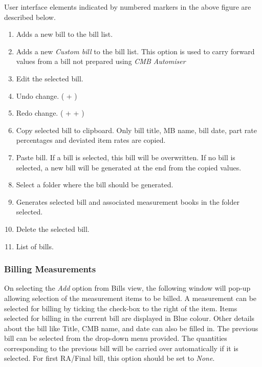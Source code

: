 \documentclass[twoside,a4paper]{refart}
\begin{document}
	 User interface elements indicated by numbered markers in the above figure are described below.
	 
	 \begin{enumerate}
	 	\item Adds a new bill to the bill list.
	 	\item Adds a new \emph{Custom bill} to the bill list. This option is used to carry forward values from a bill not prepared using \emph{CMB Automiser}
	 	\item Edit the selected bill.
	 	\item Undo change. ( + )
	 	\item Redo change. ( +  + )	 
	 	\item Copy selected bill to clipboard. Only bill title, MB name, bill date, part rate percentages and deviated item rates are copied.
	 	\item Paste bill. If a bill is selected, this bill will be overwritten. If no bill is selected, a new bill will be generated at the end from the copied values.
	 	\item Select a folder where the bill should be generated.
	 	\item Generates selected bill and associated measurement books in the folder selected.
	 	\item Delete the selected bill.
	 	\item List of bills.
	 \end{enumerate}
	 
	 \subsubsection{Billing Measurements}
	 
	 On selecting the \emph{Add} option from Bills view, the following window will pop-up allowing selection of the measurement items to be billed. A measurement can be selected for billing by ticking the check-box to the right of the item. Items selected for billing in the current bill are displayed in Blue colour. Other details about the bill like Title, CMB name, and date can also be filled in. The previous bill can be selected from the drop-down menu provided. The quantities corresponding to the previous bill will be carried over automatically if it is selected. For first RA/Final bill, this option should be set to \emph{None}.\\
	 
\end{document}
